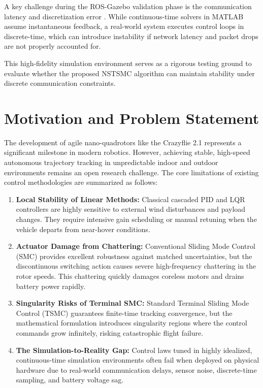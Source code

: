 A key challenge during the ROS-Gazebo validation phase is the communication latency and discretization error \cite{ref_34}. While continuous-time solvers in MATLAB assume instantaneous feedback, a real-world system executes control loops in discrete-time, which can introduce instability if network latency and packet drops are not properly accounted for. 

This high-fidelity simulation environment serves as a rigorous testing ground to evaluate whether the proposed NSTSMC algorithm can maintain stability under discrete communication constraints.

\section{Motivation and Problem Statement}
The development of agile nano-quadrotors like the Crazyflie 2.1 represents a significant milestone in modern robotics. However, achieving stable, high-speed autonomous trajectory tracking in unpredictable indoor and outdoor environments remains an open research challenge. The core limitations of existing control methodologies are summarized as follows:
\begin{enumerate}
    \item \textbf{Local Stability of Linear Methods:} Classical cascaded PID and LQR controllers are highly sensitive to external wind disturbances and payload changes. They require intensive gain scheduling or manual retuning when the vehicle departs from near-hover conditions.
    \item \textbf{Actuator Damage from Chattering:} Conventional Sliding Mode Control (SMC) provides excellent robustness against matched uncertainties, but the discontinuous switching action causes severe high-frequency chattering in the rotor speeds. This chattering quickly damages coreless motors and drains battery power rapidly.
    \item \textbf{Singularity Risks of Terminal SMC:} Standard Terminal Sliding Mode Control (TSMC) guarantees finite-time tracking convergence, but the mathematical formulation introduces singularity regions where the control commands grow infinitely, risking catastrophic flight failure.
    \item \textbf{The Simulation-to-Reality Gap:} Control laws tuned in highly idealized, continuous-time simulation environments often fail when deployed on physical hardware due to real-world communication delays, sensor noise, discrete-time sampling, and battery voltage sag.
\end{enumerate}

